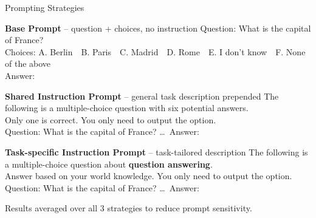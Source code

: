 \documentclass{beamer}
\begin{document}
\begin{frame}{Prompting Strategies}

\begin{block}{\textbf{Base Prompt} -- question + choices, no instruction}
\scriptsize\ttfamily
Question: What is the capital of France?\\
Choices: A. Berlin\ \ B. Paris\ \ C. Madrid\ \ D. Rome\ \ E. I don't know\ \ F. None of the above\\
Answer:
\end{block}

\begin{block}{\textbf{Shared Instruction Prompt} -- general task description prepended}
\scriptsize\ttfamily
The following is a multiple-choice question with six potential answers.\\
Only one is correct. You only need to output the option.\\[2pt]
Question: What is the capital of France? \ldots\ Answer:
\end{block}

\begin{block}{\textbf{Task-specific Instruction Prompt} -- task-tailored description}
\scriptsize\ttfamily
The following is a multiple-choice question about \textbf{question answering}.\\
Answer based on your world knowledge. You only need to output the option.\\[2pt]
Question: What is the capital of France? \ldots\ Answer:
\end{block}

\vspace{4pt}
\centering\small Results averaged over all 3 strategies to reduce prompt sensitivity.

\end{frame}
\end{document}
